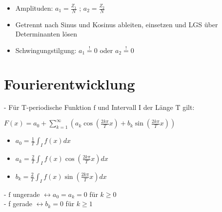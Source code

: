 \documentclass[fleqn,twoside]{article}
\begin{document}
\begin{multicols*}{3}
\begin{itemize}
\item Amplituden: $a_1 = \frac{Z_1}{N}$ ; $a_2 = \frac{Z_2}{N}$
\item Getrennt nach Sinus und Kosinus ableiten, einsetzen und LGS über Determinanten lösen
\item Schwingungstilgung: $a_1 \stackrel{!}{=} 0$ oder $a_2 \stackrel{!}{=} 0$
\end{itemize}


\section{Fourierentwicklung}
- Für T-periodische Funktion $\mathrm{f}$ und Intervall $\mathrm{I}$ der Länge $\mathrm{T}$ gilt:
    
    $F(x) =a_0+\sum_{k=1}^{\infty}\left(a_k \cos \left(\frac{2 k \pi}{T} x\right)+b_k \sin \left(\frac{2 k \pi}{T} x\right)\right)$
    \begin{itemize}
    \item $a_0 =\frac{1}{T} \int_I f(x) d x$
    \item $a_k =\frac{2}{T} \int_I f(x) \cos \left(\frac{2 k \pi}{T} x\right) d x$
    \item $b_k =\frac{2}{T} \int_I f(x) \sin \left(\frac{2 k \pi}{T} x\right) d x$
    \end{itemize}
- $\mathrm{f}$ ungerade $\leftrightarrow a_0=a_k=0$ für $k \geq 0$\\
- f gerade $\leftrightarrow b_k=0$ für $k \geq 1$




\end{multicols*}
\end{document}
